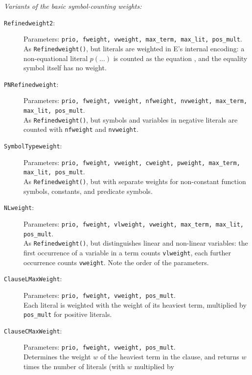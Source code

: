 \documentclass{report}
\begin{document}
\medskip
\noindent\emph{Variants of the basic symbol-counting weights:}

\begin{description}
\item[\texttt{Refinedweight2}:] Parameters: \texttt{prio, fweight,
    vweight, max\_term, max\_lit, pos\_mult}.\\
  As \texttt{Refinedweight()}, but literals
  are weighted in E's internal encoding: a non-equational literal
  $p(\ldots)$ is counted as the equation , and
  the equality symbol itself has no weight.
\item[\texttt{PNRefinedweight}:] Parameters: \texttt{prio, fweight,
    vweight, nfweight, nvweight, max\_term, max\_lit, pos\_mult}.\\
  As
  \texttt{Refinedweight()}, but symbols and variables in negative
  literals are counted with \texttt{nfweight} and \texttt{nvweight}.
\item[\texttt{SymbolTypeweight}:] Parameters: \texttt{prio, fweight,
    vweight, cweight, pweight, max\_term, max\_lit, pos\_mult}.\\
  As
  \texttt{Refinedweight()}, but with separate weights for
  non-constant function symbols, constants, and predicate symbols.
\item[\texttt{NLweight}:] Parameters: \texttt{prio, fweight, vlweight,
    vweight, max\_term, max\_lit, pos\_mult}.\\
  As \texttt{Refinedweight()}, but
  distinguishes linear and non-linear variables: the first occurrence
  of a variable in a term counts \texttt{vlweight}, each further
  occurrence counts \texttt{vweight}. Note the order of the
  parameters.
\item[\texttt{ClauseLMaxWeight}:] Parameters: \texttt{prio, fweight,
    vweight, pos\_mult}.\\
  Each literal is weighted with the weight of its heaviest term,
  multiplied by \texttt{pos\_mult} for positive literals.
\item[\texttt{ClauseCMaxWeight}:] Parameters: \texttt{prio, fweight,
    vweight, pos\_mult}.\\
  Determines the weight $w$ of the heaviest term in the clause, and
  returns $w$ times the number of literals (with $w$ multiplied by

\end{description}
\end{document}
